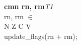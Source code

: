 


\begin{instructionblock}{\imagewidth}%
    \textbf{cmn rn, rm}\hfill\textit{T1}\\
    rn, rm $\in$ \baseregisters\\
    {N Z C V}\\
    update\_flags(rn + rm);
\end{instructionblock}

